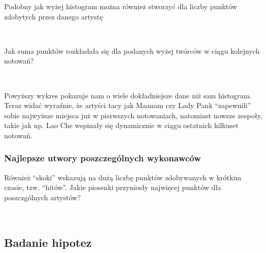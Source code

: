 \documentclass[11pt]{article}
\begin{document}
    
    Podobny jak wyżej histogram można również stworzyć dla liczby punktów
zdobytych przez danego artystę

    \begin{center}
    \end{center}
    { \hspace*{\fill} \\}
    
    Jak suma punktów rozkładała się dla podanych wyżej twórców w ciągu
kolejnych notowań?

    \begin{center}
    \end{center}
    { \hspace*{\fill} \\}
    
    Powyższy wykres pokazuje nam o wiele dokładniejsze dane niż sam
histogram. Teraz widać wyraźnie, że artyści tacy jak Maanam czy Lady
Pank ``zapewnili'' sobie najwyższe miejsca już w pierwszych notowaniach,
natomiast nowsze zespoły, takie jak np. Lao Che wspinały się dynamicznie
w ciągu ostatnich kilkuset notowań.

\hypertarget{najlepsze-utwory-poszczeguxf3lnych-wykonawcuxf3w}{%
\subsubsection{Najlepsze utwory poszczególnych
wykonawców}\label{najlepsze-utwory-poszczeguxf3lnych-wykonawcuxf3w}}

Również ``skoki'' wskazują na dużą liczbę punktów zdobywanych w krótkim
czasie, tzw. ``hitów''. Jakie piosenki przyniosły najwięcej punktów dla
poszczgólnych artystów?

    \begin{center}
    \end{center}
    { \hspace*{\fill} \\}
    
    \hypertarget{badanie-hipotez}{%
\subsection{Badanie hipotez}\label{badanie-hipotez}}
\end{document}

